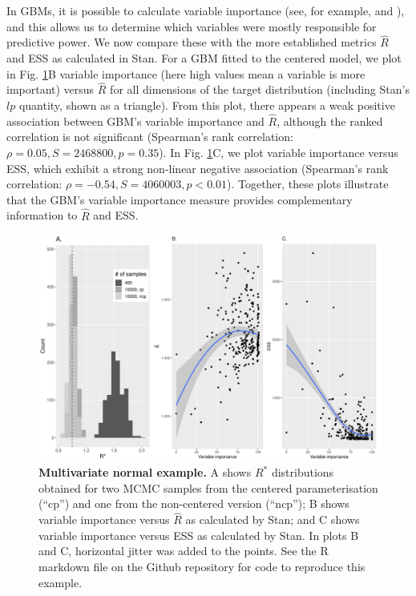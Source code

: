 \documentclass{article}
\begin{document}
In GBMs, it is possible to calculate variable importance (see, for example, \cite{friedman2001greedy} and \cite{greenwell2019package}), and this allows us to determine which variables were mostly responsible for predictive power. We now compare these with the more established metrics $\hat{R}$ and ESS as calculated in Stan. For a GBM fitted to the centered model, we plot in Fig. \ref{fig:mvt}B variable importance (here high values mean a variable is more important) versus $\hat{R}$ for all dimensions of the target distribution (including Stan's $lp$ quantity, shown as a triangle). From this plot, there appears a weak positive association between GBM's variable importance and $\hat{R}$, although the ranked correlation is not significant (Spearman's rank correlation: $\rho=0.05, S=2468800, p=0.35$). In Fig.  \ref{fig:mvt}C, we plot variable importance versus ESS, which exhibit a strong non-linear negative association (Spearman's rank correlation: $\rho=-0.54, S=4060003, p<0.01$). Together, these plots illustrate that the GBM's variable importance measure provides complementary information to $\hat{R}$ and ESS.

\begin{figure}[h]
	\centerline{\includegraphics[width=1\textwidth]{../output/mvt_three.pdf}}
	\caption{\textbf{Multivariate normal example.} A shows $R^*$ distributions obtained for two MCMC samples from the centered parameterisation (``cp'') and one from the non-centered version (``ncp''); B shows variable importance versus $\hat{R}$ as calculated by Stan; and C shows variable importance versus ESS as calculated by Stan. In plots B and C, horizontal jitter was added to the points. See the R markdown file on the Github repository for code to reproduce this example.}
	\label{fig:mvt}
\end{figure}
\end{document}
